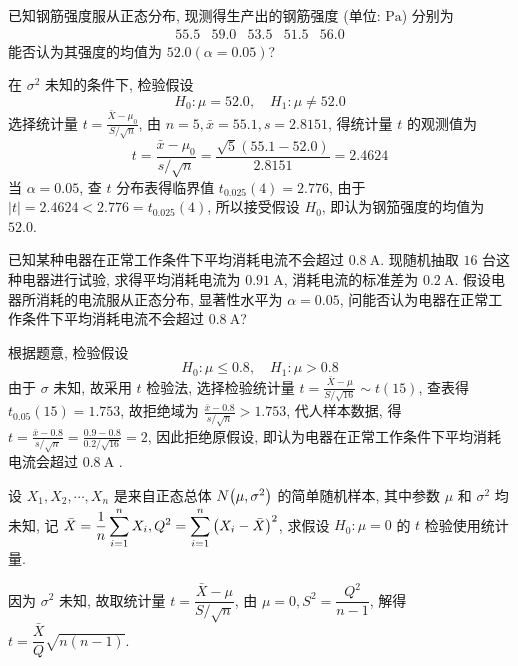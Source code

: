 \begin{example}
    已知钢筋强度服从正态分布, 现测得生产出的钢筋强度 (单位: $ \mathrm{Pa} $) 分别为
    $$\begin{array}{lllll}
            55.5 & 59.0 & 53.5 & 51.5 & 56.0
        \end{array}$$
    能否认为其强度的均值为 $ 52.0(\alpha=0.05) $?
\end{example}
\begin{solution}
    在 $ \sigma^{2} $ 未知的条件下, 检验假设
    $$H_{0}: \mu=52.0, \quad H_{1}: \mu \neq 52.0$$
    选择统计量 $\displaystyle t=\frac{\bar{X}-\mu_{0}}{S / \sqrt{n}}$, 
    由 $ n=5, \bar{x}=55.1, s=2.8151 $, 得统计量 $ t $ 的观测值为
    $$t=\frac{\bar{x}-\mu_{0}}{s / \sqrt{n}}=\frac{\sqrt{5}(55.1-52.0)}{2.8151}=2.4624$$
    当 $ \alpha=0.05 $, 查 $ t $ 分布表得临界值 $ t_{0.025}(4)=2.776 $, 由于 $ |t|=2.4624<2.776=t_{0.025}  (4)$, 所以接受假设 $ H_{0} $, 即认为钢笳强度的均值为 $ 52.0 $.
\end{solution}

\begin{example}
    已知某种电器在正常工作条件下平均消耗电流不会超过 $ 0.8 \mathrm{~A} $. 
    现随机抽取 $16$ 台这种电器进行试验, 求得平均消耗电流为 $ 0.91 \mathrm{~A} $, 消耗电流的标准差为 $ 0.2 \mathrm{~A}$. 
    假设电器所消耗的电流服从正态分布, 显著性水平为 $ \alpha=0.05$, 问能否认为电器在正常工作条件下平均消耗电流不会超过 $ 0.8 \mathrm{~A}$?
\end{example}
\begin{solution}
    根据题意, 检验假设
    $$H_{0}: \mu \leqslant 0.8, \quad H_{1}: \mu>0.8$$
    由于 $ \sigma $ 未知, 故采用 $ t $ 检验法, 选择检验统计量 $\displaystyle t=\frac{\bar{X}-\mu}{S / \sqrt{16}} \sim t(15) $, 
    查表得 $ t_{0.05}(15)=  1.753$, 故拒绝域为 $\displaystyle \frac{\bar{x}-0.8}{s / \sqrt{n}}>1.753 $, 代人样本数据, 得 $\displaystyle t=\frac{\bar{x}-0.8}{s / \sqrt{n}}=\frac{0.9-0.8}{0.2 / \sqrt{16}}=2 $, 因此拒绝原假设, 即认为电器在正常工作条件下平均消耗电流会超过  $0.8 \mathrm{~A}$ .
\end{solution}

\begin{example}[1995 数三]
    设 $X_1, X_2, \cdots , X_n$ 是来自正态总体 $N\qty(\mu,\sigma^2)$ 的简单随机样本, 其中参数 $\mu$ 和 $\sigma^2$ 均未知, 记 $\bar{X}=\displaystyle \dfrac{1}{n}\sum_{i=1}^{n} X_i, Q^2=\sum_{i=1}^{n} \qty(X_i-\bar{X})^2$, 求假设 $H_0:\mu=0$ 的 $t$ 检验使用统计量.
\end{example}
\begin{solution}
    因为 $\sigma^2$ 未知, 故取统计量 $t=\dfrac{\bar{X}-\mu}{S/\sqrt{n}}$, 由 $\mu=0, S^2=\dfrac{Q^2}{n-1}$, 解得 $t=\dfrac{\bar{X}}{Q}\sqrt{n(n-1)}.$
\end{solution}

